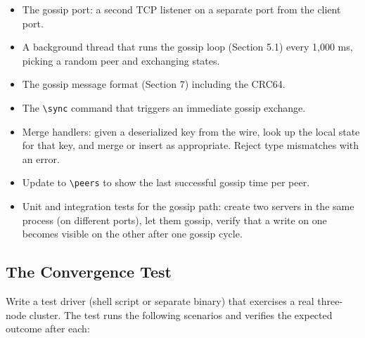 \documentclass[11pt,a4paper]{article}
\begin{document}
\begin{itemize}
\item The gossip port: a second TCP listener on a separate port from the client port.

\item A background thread that runs the gossip loop (Section 5.1) every 1{,}000 ms, picking a random peer and exchanging states.

\item The gossip message format (Section 7) including the CRC64.

\item The \verb|\sync| command that triggers an immediate gossip exchange.

\item Merge handlers: given a deserialized key from the wire, look up the local state for that key, and merge or insert as appropriate. Reject type mismatches with an error.

\item Update to \verb|\peers| to show the last successful gossip time per peer.

\item Unit and integration tests for the gossip path: create two servers in the same process (on different ports), let them gossip, verify that a write on one becomes visible on the other after one gossip cycle.
\end{itemize}

\subsection{The Convergence Test}
Write a test driver (shell script or separate binary) that exercises a real three-node cluster. The test runs the following scenarios and verifies the expected outcome after each:
\end{document}
